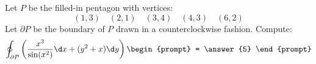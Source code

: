 \documentclass{ximera}
\begin{document}
\begin{exercise}
  Let $P$ be the filled-in pentagon with vertices:
  \[
  (1,3)\quad (2,1)\quad (3,4)\quad (4,3) \quad (6,2)
  \]
  Let $\partial P$ be the boundary of $P$ drawn in a counterclockwise
  fashion. Compute:
  \[
  \oint_{\partial P} \left(\frac{x^3}{\sin(x^2)}\d x + (y^2+x)\d y\right)
  \begin{prompt}
    = \answer{5}
  \end{prompt}
  \]
\end{exercise}
\end{document}
